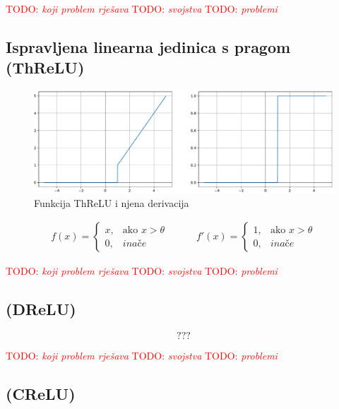 \documentclass[times, utf8, diplomski]{fer}
\def\otherwise{\textit{inače}}
\def\TODO#1{\noindent\textcolor{red}{TODO: \textit{#1}}\newline}
\def\todo#1{\TODO{#1}}
\def\todoimg#1{\begin{center} \textcolor{red}{\big[ IMAGE: \textit{#1} \big]} \end{center}}
\begin{document}
\todo{koji problem rješava}
\todo{svojstva}
\todo{problemi}

\subsection{Ispravljena linearna jedinica s pragom (ThReLU)}

\begin{figure}[H]
\includegraphics[width=\textwidth]{ThReLU.pdf}
\centering
\caption{Funkcija ThReLU i njena derivacija}
\label{fig:threlu}
\end{figure}

\begin{equation}
\begin{split}
f(x) = 
\begin{cases}
x,		& \text{ako } x > \theta \\
0,		& \otherwise
\end{cases}
\end{split}
\qquad
\begin{split}
f'(x) = 
\begin{cases}
1,		& \text{ako } x > \theta \\
0,		& \otherwise
\end{cases}
\end{split}
\end{equation}

\todo{koji problem rješava}
\todo{svojstva}
\todo{problemi}

\subsection{(DReLU)}

\todoimg{}

\begin{equation}
???
\end{equation}

\todo{koji problem rješava}
\todo{svojstva}
\todo{problemi}

\subsection{(CReLU)}
\end{document}
